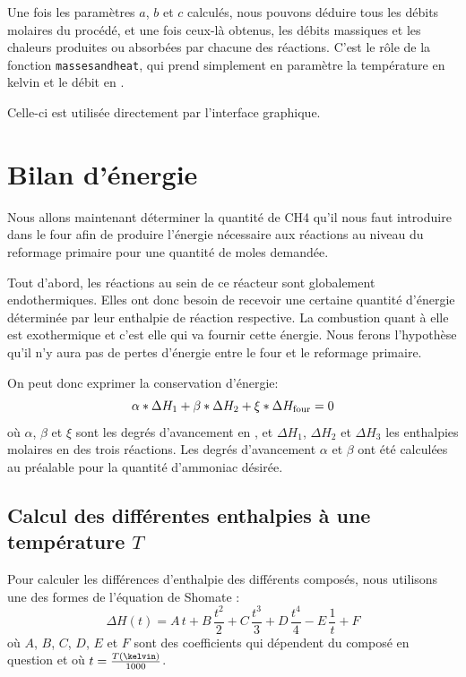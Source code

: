 \documentclass[a4paper,12pt]{article}
\begin{document}
Une fois les paramètres $a$, $b$ et $c$ calculés, nous pouvons déduire tous les débits
molaires du procédé, et une fois ceux-là obtenus,
les débits massiques et les chaleurs produites ou absorbées par chacune des réactions.
C'est le rôle de la fonction \texttt{masses\textunderscore and\textunderscore heat},
qui prend simplement en paramètre la température en kelvin et le débit en \kilogram\per\second.

Celle-ci est utilisée directement par l'interface graphique.

\section{Bilan d'énergie}

Nous allons maintenant déterminer la quantité de CH4 qu’il nous faut introduire
dans le four afin de produire l’énergie nécessaire aux réactions
au niveau du reformage primaire pour une quantité de moles demandée.  

Tout d’abord, les réactions au sein de ce réacteur sont globalement endothermiques.
Elles ont donc besoin de recevoir une certaine quantité d’énergie
déterminée par leur enthalpie de réaction respective.
La combustion quant à elle est exothermique et c’est elle qui va fournir cette énergie.
Nous ferons l’hypothèse qu’il n’y aura pas de pertes d’énergie
entre le four et le reformage primaire.

On peut donc exprimer la conservation d'énergie:
$$\alpha*\Delta H_1 + \beta*\Delta H_2 + \xi*\Delta H_{\mbox{\scriptsize{four}}} = 0$$
où $\alpha$, $\beta$ et $\xi$ sont les degrés d'avancement en \mole\per\second,
et $\Delta H_1$, $\Delta H_2$ et $\Delta H_3$ les enthalpies molaires en
\joule\per\mole des trois réactions.
Les degrés d'avancement $\alpha$ et $\beta$ ont été calculées
au préalable pour la quantité d’ammoniac désirée.


\subsection{Calcul des différentes enthalpies à une température $T$}

Pour calculer les différences d'enthalpie des différents composés,
nous utilisons une des formes de l'équation de Shomate \cite{nist}:
$$\Delta H(t) = A\,t + B\,\frac{t^2}{2} + C\,\frac{t^3}{3}
+ D\,\frac{t^4}{4} - E\,\frac{1}{t} + F$$
où $A$, $B$, $C$, $D$, $E$ et $F$ sont des coefficients
qui dépendent du composé en question et où $t=\frac{T(\kelvin)}{1000}$.
\end{document}
